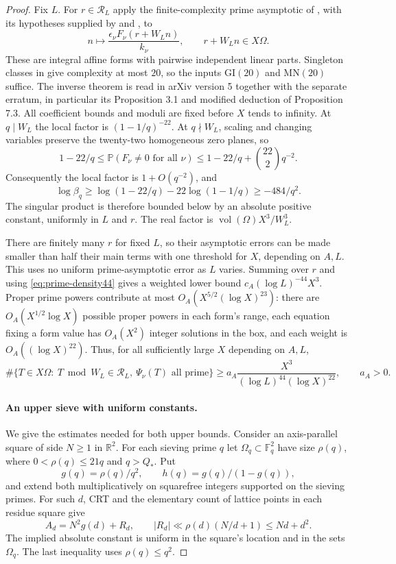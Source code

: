 \documentclass[11pt]{article}
\theoremstyle{definition}
\theoremstyle{remark}
\begin{document}
\begin{proof}
Fix $L$. For $r\in\mathcal R_L$ apply the finite-complexity
prime asymptotic of \cite[Main Theorem, p.~1763]{greentao},
with its hypotheses supplied by \cite[Theorem 1.1]{moebius}
and \cite[Theorem 1.3]{gtz}, to
\[
 n\longmapsto\frac{\epsilon_\nu F_\nu(r+W_Ln)}{k_\nu},
 \qquad r+W_Ln\in X\Omega.
\]
These are integral affine forms with pairwise independent linear
parts. Singleton classes in \cite[Definition 1.5]{greentao}
give complexity at most $20$, so the inputs $\mathrm{GI}(20)$
and $\mathrm{MN}(20)$ suffice. The inverse theorem is read in
arXiv version 5 together with the separate erratum, in particular
its Proposition 3.1 and modified deduction of Proposition 7.3.
All coefficient bounds and moduli are fixed before $X$ tends
to infinity. At $q\mid W_L$ the local factor is
$(1-1/q)^{-22}$. At $q\nmid W_L$, scaling and changing variables
preserve the twenty-two homogeneous zero planes, so
\[
 1-22/q\le
 \mathbb P(F_\nu\ne0\text{ for all }\nu)
 \le1-22/q+\binom{22}{2}q^{-2}.
\]
Consequently the local factor is $1+O(q^{-2})$, and
\[
 \log\beta_q\ge\log(1-22/q)-22\log(1-1/q)
 \ge-484/q^2.
\]
The singular product is therefore bounded below by an absolute
positive constant, uniformly in $L$ and $r$. The real factor is
$\operatorname{vol}(\Omega)X^3/W_L^3$.

There are finitely many $r$ for fixed $L$, so their asymptotic
errors can be made smaller than half their main terms with one
threshold for $X$, depending on $A,L$. This uses no uniform
prime-asymptotic error as $L$ varies. Summing over $r$ and using
\eqref{eq:prime-density44} gives a weighted lower bound
$c_A(\log L)^{-44}X^3$. Proper prime powers contribute at most
$O_A(X^{5/2}(\log X)^{23})$: there are
$O_A(X^{1/2}\log X)$ possible proper powers in each form's range,
each equation fixing a form value has $O_A(X^2)$ integer solutions
in the box, and each weight is $O_A((\log X)^{22})$.
Thus, for all sufficiently large $X$ depending on $A,L$,
\begin{equation}\label{eq:prime-lower}
 \#\{T\in X\Omega:\ T\bmod W_L\in\mathcal R_L,
                  \ \Psi_\nu(T)\text{ all prime}\}
 \ge a_A\frac{X^3}{(\log L)^{44}(\log X)^{22}},
 \qquad a_A>0.
\end{equation}

\paragraph{An upper sieve with uniform constants.}
We give the estimates needed for both upper bounds. Consider an
axis-parallel square of side $N\ge1$ in $\mathbb R^2$. For each sieving prime
$q$ let $\Omega_q\subset\mathbb F_q^2$ have size $\rho(q)$,
where $0<\rho(q)\le21q$ and $q>Q_*$. Put
\[
 g(q)=\rho(q)/q^2,\qquad
 h(q)=g(q)/(1-g(q)),
\]
and extend both multiplicatively on squarefree integers supported
on the sieving primes. For such $d$, CRT and the elementary count
of lattice points in each residue square give
\begin{equation}\label{eq:prime-residue-error}
 A_d=N^2g(d)+R_d,\qquad
 |R_d|\ll\rho(d)(N/d+1)\le Nd+d^2.
\end{equation}
The implied absolute constant is uniform in the square's location
and in the sets $\Omega_q$. The last inequality uses
$\rho(q)\le q^2$.


\end{proof}
\end{document}
